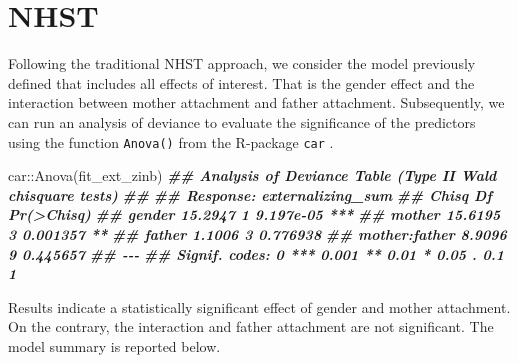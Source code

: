 \documentclass[
]{book}
\newenvironment{Shaded}{\begin{snugshade}}{\end{snugshade}}
\newcommand{\DocumentationTok}[1]{\textcolor[rgb]{0.56,0.35,0.01}{\textbf{\textit{#1}}}}
\newcommand{\FunctionTok}[1]{\textcolor[rgb]{0.00,0.00,0.00}{#1}}
\newcommand{\NormalTok}[1]{#1}
\newcommand{\SpecialCharTok}[1]{\textcolor[rgb]{0.00,0.00,0.00}{#1}}
\begin{document}
\hypertarget{nhst-ext}{%
\chapter{NHST}\label{nhst-ext}}

Following the traditional NHST approach, we consider the model previously defined that includes all effects of interest. That is the gender effect and the interaction between mother attachment and father attachment. Subsequently, we can run an analysis of deviance to evaluate the significance of the predictors using the function \texttt{Anova()} from the R-package \texttt{car} \citep{foxCompanionAppliedRegression2019}.

\begin{Shaded}
\begin{Highlighting}[]
\NormalTok{car}\SpecialCharTok{::}\FunctionTok{Anova}\NormalTok{(fit\_ext\_zinb)}
\DocumentationTok{\#\# Analysis of Deviance Table (Type II Wald chisquare tests)}
\DocumentationTok{\#\# }
\DocumentationTok{\#\# Response: externalizing\_sum}
\DocumentationTok{\#\#                 Chisq Df Pr(\textgreater{}Chisq)    }
\DocumentationTok{\#\# gender        15.2947  1  9.197e{-}05 ***}
\DocumentationTok{\#\# mother        15.6195  3   0.001357 ** }
\DocumentationTok{\#\# father         1.1006  3   0.776938    }
\DocumentationTok{\#\# mother:father  8.9096  9   0.445657    }
\DocumentationTok{\#\# {-}{-}{-}}
\DocumentationTok{\#\# Signif. codes:  0 \textquotesingle{}***\textquotesingle{} 0.001 \textquotesingle{}**\textquotesingle{} 0.01 \textquotesingle{}*\textquotesingle{} 0.05 \textquotesingle{}.\textquotesingle{} 0.1 \textquotesingle{} \textquotesingle{} 1}
\end{Highlighting}
\end{Shaded}

Results indicate a statistically significant effect of gender and mother attachment. On the contrary, the interaction and father attachment are not significant. The model summary is reported below.
\end{document}
